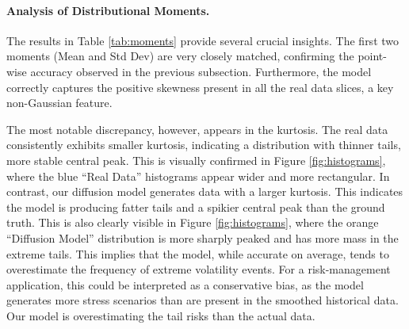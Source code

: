 \documentclass{article}
\begin{document}
\paragraph{Analysis of Distributional Moments.}
The results in Table \ref{tab:moments} provide several crucial insights. The first two moments (Mean and Std Dev) are very closely matched, confirming the point-wise accuracy observed in the previous subsection. Furthermore, the model correctly captures the positive skewness present in all the real data slices, a key non-Gaussian feature.

The most notable discrepancy, however, appears in the kurtosis. The real data consistently exhibits smaller kurtosis, indicating a distribution with thinner tails, more stable central peak. This is visually confirmed in Figure \ref{fig:histograms}, where the blue ``Real Data'' histograms appear wider and more rectangular. In contrast, our diffusion model generates data with a larger kurtosis. This indicates the model is producing fatter tails and a spikier central peak than the ground truth. This is also clearly visible in Figure \ref{fig:histograms}, where the orange ``Diffusion Model'' distribution is more sharply peaked and has more mass in the extreme tails. This implies that the model, while accurate on average, tends to overestimate the frequency of extreme volatility events. For a risk-management application, this could be interpreted as a conservative bias, as the model generates more stress scenarios than are present in the smoothed historical data. Our model is overestimating the tail risks than the actual data.
\end{document}
